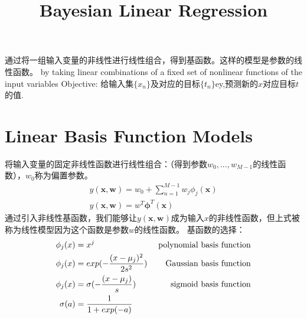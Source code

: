 \documentclass[a4paper]{article}
\begin{document}
\title{Bayesian Linear Regression}
\author{}
\maketitle

通过将一组输入变量的非线性进行线性组合，得到基函数。这样的模型是参数的线性函数。
by taking linear combinations of a fixed set of nonlinear functions of the input variables
Objective:
给输入集$\{x_n\}$及对应的目标$\{t_n\}$ey,预测新的$x$对应目标$t$的值.

\section{Linear Basis Function Models}
将输入变量的固定非线性函数进行线性组合：（得到参数$w_0,...,w_{M-1}$的线性函数），$w_0$称为偏置参数。
\begin{align*}
  y(\mathbf{x},\mathbf{w}) = w_0 + \sum_{n=1}^{M-1} w_j\phi_j(\mathbf{x})\\
  y(\mathbf{x},\mathbf{w}) = w^T \boldsymbol{\phi}^T(\mathbf{x})
\end{align*}
通过引入非线性基函数，我们能够让$y(\mathbf{x},\mathbf{w})$成为输入$x$的非线性函数，但上式被称为线性模型因为这个函数是参数$w$的线性函数。
基函数的选择：
\begin{align*}
  \phi_j(x) &= x^j &\text{ polynomial basis function}\\
  \phi_j(x) &= exp(-{(x-\mu_j)^2 \over 2s^2 }) &\text{ Gaussian basis function}\\
  \phi_j(x) &= \sigma(-{(x-\mu_j) \over s }) &\text{  sigmoid basis function}\\
  \sigma(a) &= {1 \over 1+exp(-a)}
\end{align*}
\end{document}
